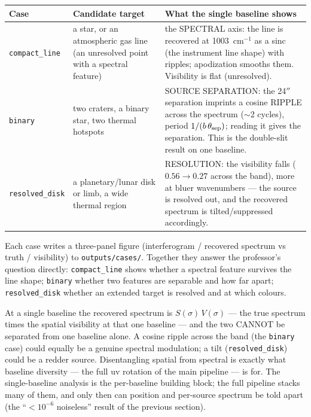 \documentclass[11pt]{article}
\newcommand{\code}[1]{\texttt{\small #1}}
\begin{document}
\begin{center}\small
\begin{tabular}{@{}p{2.6cm}p{4.6cm}p{5.6cm}@{}}
\toprule
\textbf{Case} & \textbf{Candidate target} & \textbf{What the single baseline shows}\\
\midrule
\code{compact\_line} & a star, or an atmospheric gas line (an unresolved
point with a spectral feature) & the SPECTRAL axis: the line is recovered at
1003~cm$^{-1}$ as a sinc (the instrument line shape) with ripples;
apodization smooths them. Visibility is flat (unresolved).\\[4pt]
\code{binary} & two craters, a binary star, two thermal hotspots & SOURCE
SEPARATION: the 24$''$ separation imprints a cosine RIPPLE across the
spectrum ($\sim$2 cycles), period $1/(b\,\theta_{\rm sep})$; reading it gives
the separation. This is the double-slit result on one baseline.\\[4pt]
\code{resolved\_disk} & a planetary/lunar disk or limb, a wide thermal
region & RESOLUTION: the visibility falls ($0.56\!\to\!0.27$ across the band),
more at bluer wavenumbers --- the source is resolved out, and the recovered
spectrum is tilted/suppressed accordingly.\\
\bottomrule
\end{tabular}
\end{center}

Each case writes a three-panel figure (interferogram / recovered spectrum vs
truth / visibility) to \code{outputs/cases/}. Together they answer the
professor's question directly: \code{compact\_line} shows whether a spectral
feature survives the line shape; \code{binary} whether two features are
separable and how far apart; \code{resolved\_disk} whether an extended target
is resolved and at which colours.

\begin{flagbox}[title={\textsc{What one baseline cannot do}}]
At a single baseline the recovered spectrum is $S(\sigma)\,V(\sigma)$ --- the
true spectrum times the spatial visibility at that one baseline --- and the
two CANNOT be separated from one baseline alone. A cosine ripple across the
band (the \code{binary} case) could equally be a genuine spectral modulation;
a tilt (\code{resolved\_disk}) could be a redder source. Disentangling
spatial from spectral is exactly what baseline diversity --- the full uv
rotation of the main pipeline --- is for. The single-baseline analysis is the
per-baseline building block; the full pipeline stacks many of them, and only
then can position and per-source spectrum be told apart (the
``$<10^{-6}$ noiseless'' result of the previous section).
\end{flagbox}
\end{document}
